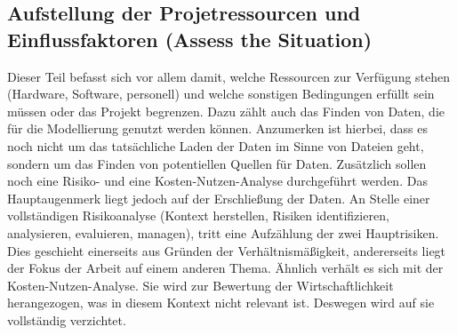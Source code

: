 \subsection*{Aufstellung der Projetressourcen und Einflussfaktoren (Assess the Situation)} \label{subsec:assesTheSituation}
Dieser Teil befasst sich vor allem damit, welche Ressourcen zur Verfügung stehen (Hardware, Software, personell) und welche sonstigen Bedingungen erfüllt sein müssen oder das Projekt begrenzen. Dazu zählt auch das Finden von Daten, die für die Modellierung genutzt werden können. Anzumerken ist hierbei, dass es noch nicht um das tatsächliche Laden der Daten im Sinne von Dateien geht, sondern um das Finden von potentiellen Quellen für Daten. Zusätzlich sollen noch eine Risiko- und eine Kosten-Nutzen-Analyse durchgeführt werden. Das Hauptaugenmerk liegt jedoch auf der Erschließung der Daten. 
\newline
An Stelle einer vollständigen Risikoanalyse (Kontext herstellen, Risiken identifizieren, analysieren, evaluieren, managen\citep[S.~43]{sowa_management_2017}), tritt eine Aufzählung der zwei Hauptrisiken. Dies geschieht einerseits aus Gründen der Verhältnismäßigkeit, andererseits liegt der Fokus der Arbeit auf einem anderen Thema. Ähnlich verhält es sich mit der Kosten-Nutzen-Analyse. Sie wird zur Bewertung der Wirtschaftlichkeit herangezogen, was in diesem Kontext nicht relevant ist. Deswegen wird auf sie vollständig verzichtet.

